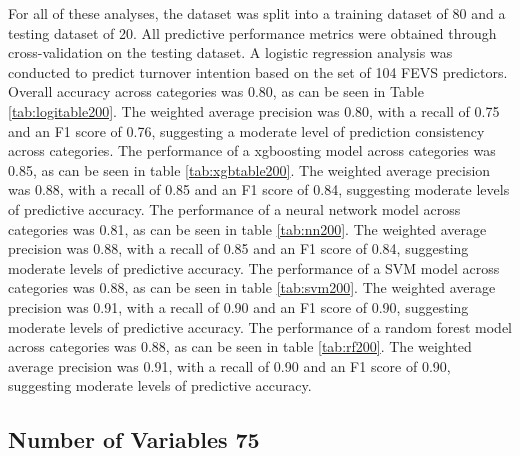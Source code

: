 \documentclass[
  man]{apa7}
\begin{document}
For all of these analyses, the dataset was split into a training dataset of 80 and a testing dataset of 20. All predictive performance metrics were obtained through cross-validation on the testing dataset. A logistic regression analysis was conducted to predict turnover intention based on the set of 104 FEVS predictors. Overall accuracy across categories was 0.80, as can be seen in Table \ref{tab:logitable200}. The weighted average precision was 0.80, with a recall of 0.75 and an F1 score of 0.76, suggesting a moderate level of prediction consistency across categories.
The performance of a xgboosting model across categories was 0.85, as can be seen in table \ref{tab:xgbtable200}. The weighted average precision was 0.88, with a recall of 0.85 and an F1 score of 0.84, suggesting moderate levels of predictive accuracy.
The performance of a neural network model across categories was 0.81, as can be seen in table \ref{tab:nn200}. The weighted average precision was 0.88, with a recall of 0.85 and an F1 score of 0.84, suggesting moderate levels of predictive accuracy.
The performance of a SVM model across categories was 0.88, as can be seen in table \ref{tab:svm200}. The weighted average precision was 0.91, with a recall of 0.90 and an F1 score of 0.90, suggesting moderate levels of predictive accuracy.
The performance of a random forest model across categories was 0.88, as can be seen in table \ref{tab:rf200}. The weighted average precision was 0.91, with a recall of 0.90 and an F1 score of 0.90, suggesting moderate levels of predictive accuracy.

\hypertarget{number-of-variables-75}{%
\subsection{Number of Variables 75}\label{number-of-variables-75}}
\end{document}
